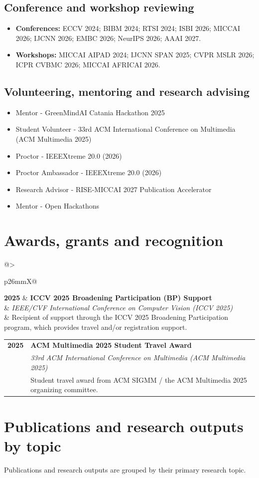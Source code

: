 \documentclass[10pt,a4paper]{article}
\makeatletter
\newcommand{\cvrole}[4]{%
\begin{tabularx}{\linewidth}{@{}>{\raggedright\arraybackslash}p{26mm}X@{}}
\textcolor{GoldAccent}{\textbf{#1}} &
\textbf{\color{Navy}#2}\\[-1pt]
& \textit{#3}\\[-1pt]
& \color{BodyGrey}#4
\end{tabularx}\vspace{3pt}}
\makeatother
\begin{document}
\subsection{Conference and workshop reviewing}
\begin{itemize}
\item \textbf{Conferences:} ECCV 2024; BIBM 2024; RTSI 2024; ISBI 2026; MICCAI 2026; IJCNN 2026; EMBC 2026; NeurIPS 2026; AAAI 2027.
\item \textbf{Workshops:} MICCAI AIPAD 2024; IJCNN SPAN 2025; CVPR MSLR 2026; ICPR CVBMC 2026; MICCAI AFRICAI 2026.
\end{itemize}
\subsection{Volunteering, mentoring and research advising}
\begin{itemize}
\item Mentor - GreenMindAI Catania Hackathon 2025
\item Student Volunteer - 33rd ACM International Conference on Multimedia (ACM Multimedia 2025)
\item Proctor - IEEEXtreme 20.0 (2026)
\item Proctor Ambassador - IEEEXtreme 20.0 (2026)
\item Research Advisor - RISE-MICCAI 2027 Publication Accelerator
\item Mentor - Open Hackathons
\end{itemize}

\section{Awards, grants and recognition}
\cvrole{2025}{ICCV 2025 Broadening Participation (BP) Support}{IEEE/CVF International Conference on Computer Vision (ICCV 2025)}{Recipient of support through the ICCV 2025 Broadening Participation program, which provides travel and/or registration support.}
\cvrole{2025}{ACM Multimedia 2025 Student Travel Award}{33rd ACM International Conference on Multimedia (ACM Multimedia 2025)}{Student travel award from ACM SIGMM / the ACM Multimedia 2025 organizing committee.}

\section{Publications and research outputs by topic}
{\small\color{BodyGrey}Publications and research outputs are grouped by their primary research topic.}\vspace{4pt}
\end{document}
